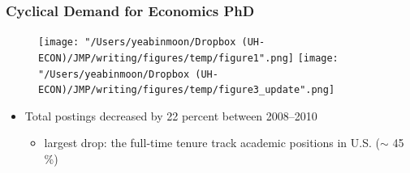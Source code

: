 \documentclass[10pt,svgnames,fragile]{beamer}
\begin{document}
\begin{frame}
	\frametitle{Cyclical Demand for Economics PhD}
	
	\begin{figure}
		\centering
		\texttt{[image: "/Users/yeabinmoon/Dropbox (UH-ECON)/JMP/writing/figures/temp/figure1".png]} 
		\texttt{[image: "/Users/yeabinmoon/Dropbox (UH-ECON)/JMP/writing/figures/temp/figure3\_update".png]} 
	\end{figure}
	

	\begin{itemize}	
		\item Total postings decreased by 22 percent between 2008--2010
		\vspace{2 mm}
		\begin{itemize}
			\item largest drop: the full-time tenure track academic positions in U.S. ($\sim$ 45 \%)
		\end{itemize}
	\end{itemize}
\end{frame}


%	
\end{document}
